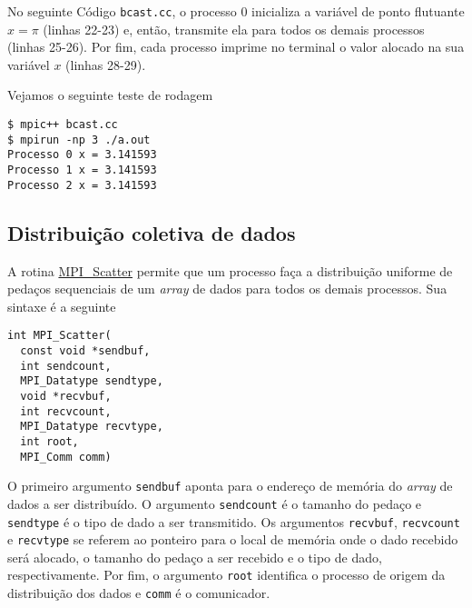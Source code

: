 \begin{ex}
  No seguinte Código \verb+bcast.cc+, o processo 0 inicializa a variável de ponto flutuante $x = \pi$ (linhas 22-23) e, então, transmite ela para todos os demais processos (linhas 25-26). Por fim, cada processo imprime no terminal o valor alocado na sua variável $x$ (linhas 28-29).



Vejamos o seguinte teste de rodagem
\begin{verbatim}
$ mpic++ bcast.cc
$ mpirun -np 3 ./a.out                                                           
Processo 0 x = 3.141593
Processo 1 x = 3.141593
Processo 2 x = 3.141593
\end{verbatim}
\end{ex}

\subsection {Distribuição coletiva de dados}

A rotina \href{https://www.open-mpi.org/doc/current/man3/MPI\_Scatter.3.php}{MPI\_Scatter} permite que um processo faça a distribuição uniforme de pedaços sequenciais de um {\it array} de dados para todos os demais processos. Sua sintaxe é a seguinte
\begin{verbatim}
int MPI_Scatter(
  const void *sendbuf, 
  int sendcount, 
  MPI_Datatype sendtype,
  void *recvbuf, 
  int recvcount, 
  MPI_Datatype recvtype, 
  int root,
  MPI_Comm comm)
\end{verbatim}
O primeiro argumento \verb+sendbuf+ aponta para o endereço de memória do {\it array} de dados a ser distribuído. O argumento \verb+sendcount+ é o tamanho do pedaço e \verb+sendtype+ é o tipo de dado a ser transmitido. Os argumentos \verb+recvbuf+, \verb+recvcount+ e \verb+recvtype+ se referem ao ponteiro para o local de memória onde o dado recebido será alocado, o tamanho do pedaço a ser recebido e o tipo de dado, respectivamente. Por fim, o argumento \verb+root+ identifica o processo de origem da distribuição dos dados e \verb+comm+ é o comunicador.

